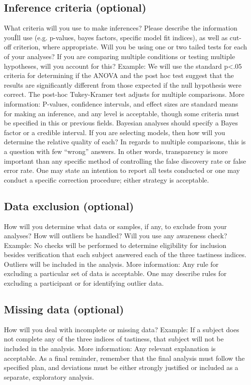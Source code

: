 \documentclass[
10pt, %
a4paper, %
oneside, %
headinclude,footinclude, %
BCOR5mm, %
]{scrartcl}
\begin{document}
\subsection{Inference criteria (optional)}
What criteria will you use to make inferences? Please describe the information youÍll use (e.g. p-values, bayes factors, specific model fit indices), as well as cut-off criterion, where appropriate. Will you be using one or two tailed tests for each of your analyses? If you are comparing multiple conditions or testing multiple hypotheses, will you account for this?
Example: We will use the standard p<.05 criteria for determining if the ANOVA and the post hoc test suggest that the results are significantly different from those expected if the null hypothesis were correct. The post-hoc Tukey-Kramer test adjusts for multiple comparisons. 
More information: P-values, confidence intervals, and effect sizes are standard means for making an inference, and any level is acceptable, though some criteria must be specified in this or previous fields. Bayesian analyses should specify a Bayes factor or a credible interval. If you are selecting models, then how will you determine the relative quality of each? In regards to multiple comparisons, this is a question with few “wrong” answers. In other words, transparency is more important than any specific method of controlling the false discovery rate or false error rate. One may state an intention to report all tests conducted or one may conduct a specific correction procedure; either strategy is acceptable.



\subsection{Data exclusion (optional)}
How will you determine what data or samples, if any, to exclude from your analyses? How will outliers be handled? Will you use any awareness check?
Example: No checks will be performed to determine eligibility for inclusion besides verification that each subject answered each of the three tastiness indices. Outliers will be included in the analysis. 
More information: Any rule for excluding a particular set of data is acceptable. One may describe rules for excluding a participant or for identifying outlier data.


\subsection{Missing data (optional)}
How will you deal with incomplete or missing data?
Example: If a subject does not complete any of the three indices of tastiness, that subject will not be included in the analysis.
More information: Any relevant explanation is acceptable. As a final reminder, remember that the final analysis must follow the specified plan, and deviations must be either strongly justified or included as a separate, exploratory analysis.
\end{document}
